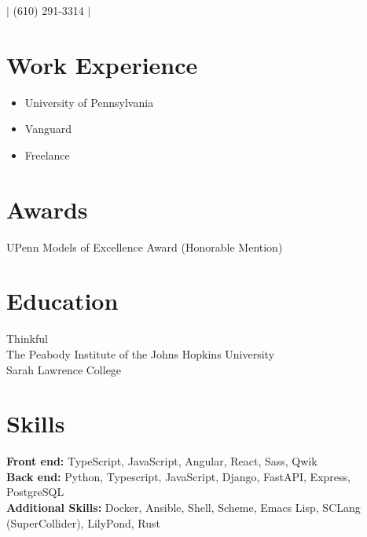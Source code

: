 \documentclass{article}
\begin{document}

$|$
\small{(610) 291-3314}
$|$

\section*{Work Experience}

\begin{itemize}
  \item{University of Pennsylvania}
  \item{Vanguard}
  \item{Freelance}
\end{itemize}

\section*{Awards}

UPenn Models of Excellence Award (Honorable Mention)

\section*{Education}

Thinkful \\
The Peabody Institute of the Johns Hopkins University \\
Sarah Lawrence College

\section*{Skills}

\textbf{Front end:} TypeScript, JavaScript, Angular, React, Sass, Qwik \\
\textbf{Back end:} Python, Typescript, JavaScript, Django, FastAPI, Express,
  PostgreSQL \\
\textbf{Additional Skills:} Docker, Ansible, Shell, Scheme, Emacs Lisp, SCLang
  (SuperCollider), LilyPond, Rust
\end{document}
